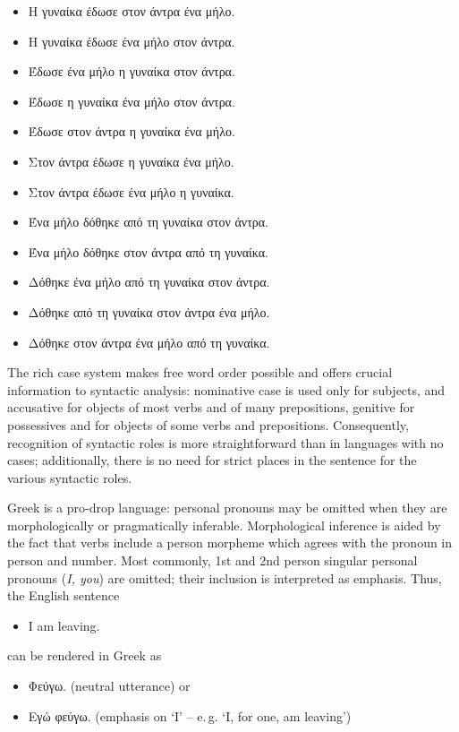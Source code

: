 \documentclass[]{../../metanetpaper}
\begin{document}
\begin{multicols}{2}
\begin{itemize}    
\item Η γυναίκα έδωσε στον άντρα ένα μήλο.
\item Η γυναίκα έδωσε ένα μήλο στον άντρα.
\item Έδωσε ένα μήλο η γυναίκα στον άντρα.
\item Έδωσε η γυναίκα ένα μήλο στον άντρα.
\item Έδωσε στον άντρα η γυναίκα ένα μήλο.
\item Στον άντρα έδωσε η γυναίκα ένα μήλο.
\item Στον άντρα έδωσε ένα μήλο η γυναίκα.
\item Ένα μήλο δόθηκε από τη γυναίκα στον άντρα.
\item Ένα μήλο δόθηκε στον άντρα από τη γυναίκα.
\item Δόθηκε ένα μήλο από τη γυναίκα στον άντρα.
\item Δόθηκε από τη γυναίκα στον άντρα ένα μήλο.
\item Δόθηκε στον άντρα ένα μήλο από τη γυναίκα.
\end{itemize}
 
The rich case system makes free word order possible and offers crucial information to syntactic analysis: nominative case is used only for subjects, and accusative for objects of most verbs and of many prepositions, genitive for possessives and for objects of some verbs and prepositions. Consequently, recognition of syntactic roles is more straightforward than in languages with no cases; additionally, there is no need for strict places in the sentence for the various syntactic roles.

Greek is a pro-drop language: personal pronouns may be omitted when they are morphologically or pragmatically inferable. Morphological inference is aided by the fact that verbs include a person morpheme which agrees with the pronoun in person and number. Most commonly, 1st and 2nd person singular personal pronouns (\textit{I, you}) are omitted; their inclusion is interpreted as emphasis. Thus, the English sentence 

\begin{itemize}
\item[] I am leaving.
\end{itemize}

can be rendered in Greek as

\begin{itemize}
\item Φεύγω. (neutral utterance) or 
\item Εγώ φεύγω. (emphasis on ‘I’ – e.\,g. ‘I, for one, am leaving’)
\end{itemize}


\end{multicols}
\end{document}
